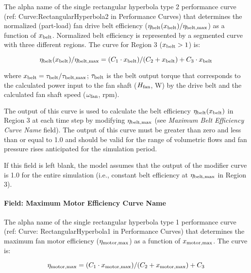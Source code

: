 The alpha name of the single rectangular hyperbola type 2 performance curve (ref: Curve:RectangularHyperbola2 in Performance Curves) that determines the normalized (part-load) fan drive belt efficiency (\(\eta_{\rm{belt}} (x_{\rm{belt}}) / \eta_{\rm{belt, max}}\)) as a function of \(x_{\rm{belt}}\). Normalized belt efficiency is represented by a segmented curve with three different regions. The curve for Region 3 (\(x_{\rm{belt}} > 1\)) is:

\begin{equation}
  \eta_{\rm{belt}} ( x_{\rm{belt}} ) / \eta_{\rm{belt, max}} = ( C_1 \cdot x_{\rm{belt}} ) / ( C_2 + x_{\rm{belt}} ) + C_3 \cdot x_{\rm{belt}}
\end{equation}

where \(x_{\rm{belt}} = \tau_{\rm{belt}} / \tau_{\rm{belt, max}}\); \(\tau_{\rm{belt}}\) is the belt output torque that corresponds to the calculated power input to the fan shaft (\(H_{\rm{fan}}\), W) by the drive belt and the calculated fan shaft speed (\(\omega_{\rm{fan}}\), rpm).

The output of this curve is used to calculate the belt efficiency \(\eta_{\rm{belt}} (x_{\rm{belt}})\) in Region 3 at each time step by modifying \(\eta_{\rm{belt, max}}\) (see \emph{Maximum Belt Efficiency Curve Name} field). The output of this curve must be greater than zero and less than or equal to 1.0 and should be valid for the range of volumetric flows and fan pressure rises anticipated for the simulation period.

If this field is left blank, the model assumes that the output of the modifier curve is 1.0 for the entire simulation (i.e., constant belt efficiency at \(\eta_{\rm{belt, max}}\) in Region 3).

\paragraph{Field: Maximum Motor Efficiency Curve Name}\label{field-maximum-motor-efficiency-curve-name}

The alpha name of the single rectangular hyperbola type 1 performance curve (ref: Curve: RectangularHyperbola1 in Performance Curves) that determines the maximum fan motor efficiency (\(\eta_{\rm{motor, max}}\)) as a function of \(x_{\rm{motor, max}}\). The curve is:

\begin{equation}
  \eta_{\rm{motor, max}} = (C_1 \cdot x_{\rm{motor, max}}) / (C_2 + x_{\rm{motor, max}}) + C_3
\end{equation}

